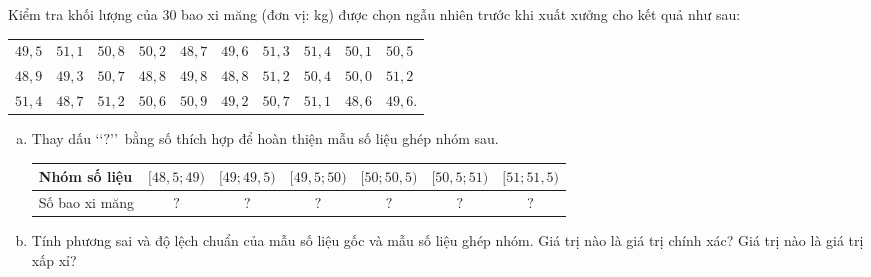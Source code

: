 \begin{bt}%
	Kiểm tra khối lượng của $30$ bao xi măng (đơn vị: kg) được chọn ngẫu nhiên trước khi xuất xưởng cho kết quả như sau:
\begin{center}
		\begin{tabular}{llllllllll}
		$49{,}5$ & $51{,}1$ & $50{,}8$ & $50{,}2$ & $48{,}7$ & $49{,}6$ & $51{,}3$ & $51{,}4$ & $50{,}1$ & $50{,}5$ \\
		$48{,}9$ & $49{,}3$ & $50{,}7$ & $48{,}8$ & $49{,}8$ & $48{,}8$ & $51{,}2$ & $50{,}4$ & $50{,}0$ & $51{,}2$ \\
		$51{,}4$ & $48{,}7$ & $51{,}2$ & $50{,}6$ & $50{,}9$ & $49{,}2$ & $50{,}7$ & $51{,}1$ & $48{,}6$ & $49{,}6$.
	\end{tabular}
\end{center}	
	\begin{enumerate}[a)]
		\item Thay dấu \lq\lq $?$\rq\rq ~bằng số thích hợp để hoàn thiện mẫu số liệu ghép nhóm sau.
		\begin{center}
			\begin{tabular}{|l|c|c|c|c|c|c|}
				\hline Nhóm số liệu & {$[48{,}5; 49)$} & {$[49; 49{,}5)$} & {$[49{,}5; 50)$} & {$[50 ; 50{,}5)$} & {$[50{,}5 ; 51)$} & {$[51 ; 51{,}5)$} \\
				\hline Số bao xi măng & $?$ & $?$ & $?$ & $?$ & $?$ & $?$ \\
				\hline
			\end{tabular}
		\end{center}
	\item Tính phương sai và độ lệch chuẩn của mẫu số liệu gốc và mẫu số liệu ghép nhóm. Giá trị nào là giá trị chính xác? Giá trị nào là giá trị xấp xỉ?
	\end{enumerate}
\loigiai{
	\begin{enumerate}[a)]
		\item 
	\begin{center}
		\begin{tabular}{|l|c|c|c|c|c|c|}
			\hline Nhóm số liệu & {$[48{,}5; 49)$} & {$[49; 49{,}5)$} & {$[49{,}5; 50)$} & {$[50 ; 50{,}5)$} & {$[50{,}5; 51)$} & {$[51; 51{,}5)$} \\
			\hline Số bao xi măng & $6$ & $2$ & $4$ & $4$ & $6$ & $8$ \\
			\hline

\end{tabular}
\end{center}
\end{enumerate}}
\end{bt}
